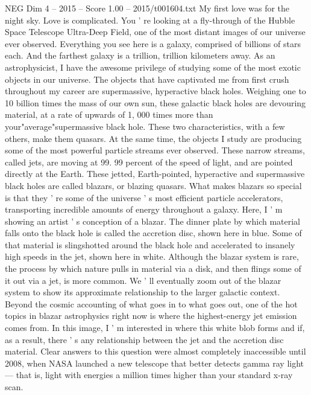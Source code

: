 \begin{textsample}{NEG Dim 4 – 2015 – Score 1.00 – 2015/t001604.txt}  \label{ex:f4_neg_031}
My first love was for the night sky.
Love is complicated.
You ' re looking at a fly-through of the Hubble Space Telescope Ultra-Deep Field, one of the most distant images of our universe ever observed.
Everything you see here is a galaxy, comprised of billions of stars each.
And the farthest galaxy is a trillion, trillion kilometers away.
As an astrophysicist, I have the awesome privilege of studying some of the most exotic objects in our universe.
The objects that have captivated me from first crush throughout my career are supermassive, hyperactive black holes.
Weighing one to 10 billion times the mass of our own sun, these galactic black holes are devouring material, at a rate of upwards of 1, 000 times more than your"average"supermassive black hole.
These two characteristics, with a few others, make them quasars.
At the same time, the objects I study are producing some of the most powerful particle streams ever observed.
These narrow streams, called jets, are moving at 99. 99 percent of the speed of light, and are pointed directly at the Earth.
These jetted, Earth-pointed, hyperactive and supermassive black holes are called blazars, or blazing quasars.
What makes blazars so special is that they ' re some of the universe ' s most efficient particle accelerators, transporting incredible amounts of energy throughout a galaxy.
Here, I ' m showing an artist ' s conception of a blazar.
The dinner plate by which material falls onto the black hole is called the accretion disc, shown here in blue.
Some of that material is slingshotted around the black hole and accelerated to insanely high speeds in the jet, shown here in white.
Although the blazar system is rare, the process by which nature pulls in material via a disk, and then flings some of it out via a jet, is more common.
We ' ll eventually zoom out of the blazar system to show its approximate relationship to the larger galactic context.
Beyond the cosmic accounting of what goes in to what goes out, one of the hot topics in blazar astrophysics right now is where the highest-energy jet emission comes from.
In this image, I ' m interested in where this white blob forms and if, as a result, there ' s any relationship between the jet and the accretion disc material.
Clear answers to this question were almost completely inaccessible until 2008, when NASA launched a new telescope that better detects gamma ray light — that is, light with energies a million times higher than your standard x-ray scan.

\end{textsample}
